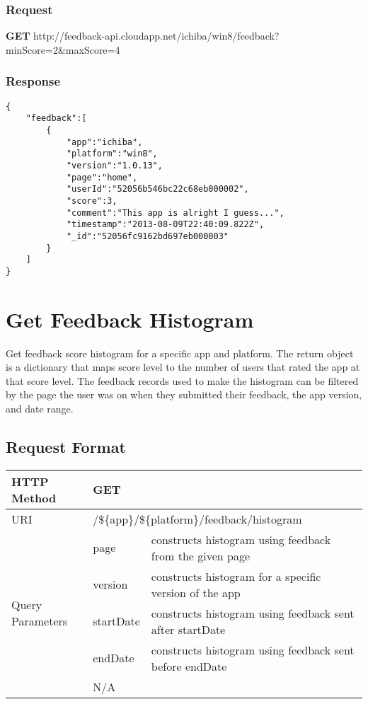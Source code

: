 \subsubsection{Request}

\textbf{GET} http://feedback-api.cloudapp.net/ichiba/win8/feedback?minScore=2\&maxScore=4

\subsubsection{Response}
\begin{verbatim}
{
    "feedback":[
        {
            "app":"ichiba",
            "platform":"win8",
            "version":"1.0.13",
            "page":"home",
            "userId":"52056b546bc22c68eb000002",
            "score":3,
            "comment":"This app is alright I guess...",
            "timestamp":"2013-08-09T22:40:09.822Z",
            "_id":"52056fc9162bd697eb000003"
        }
    ]
}
\end{verbatim}


\section{Get Feedback Histogram}

Get feedback score histogram for a specific app and platform. The return object
is a dictionary that maps score level to the number of users that
rated the app at that score level. The feedback records used to make the
histogram can be filtered by the page the user was on when they submitted
their feedback, the app version, and date range.

\subsection{Request Format}

\begin{center}
\begin{tabular}{|l||l|l|}
\hline
HTTP Method & \multicolumn{2}{l|}{GET}           \\
\hline
\hline
URI         & \multicolumn{2}{l|}{/\$\{app\}/\$\{platform\}/feedback/histogram} \\
\hline
\hline
\multirow{5}{*}{Query Parameters}

& page & constructs histogram using feedback from the given page \\
\cline{2-3}
& version & constructs histogram for a specific version of the app \\
\cline{2-3}
& startDate & constructs histogram using feedback sent after startDate \\
\cline{2-3}
& endDate & constructs histogram using feedback sent before endDate \\

\hline
\hline
Body        & \multicolumn{2}{l|}{N/A}           \\
\hline
\end{tabular}
\end{center}

